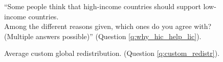 \begin{figure}[h!]
    \caption[Agreement with rationales for global redistribution]{``Some people think that high-income countries should support low-income countries.~\\Among the different reasons given, which ones do you agree with? (Multiple answers possible)'' (Question \ref{q:why_hic_help_lic}).
    }\label{fig:why_hic_help_lic}
\end{figure}

\begin{figure}[h!]
    \caption[Average custom redistribution]{Average custom global redistribution. (Question \ref{q:custom_redistr}).
    }\label{fig:custom_redistr_mean}
\end{figure}

